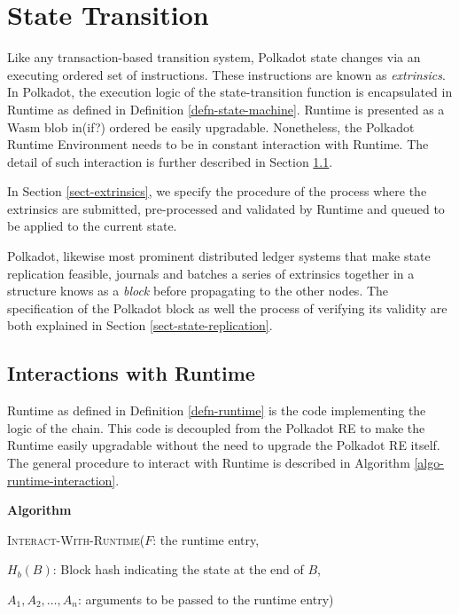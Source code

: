\documentclass{book}
\newcommand{\tmem}[1]{{\em #1\/}}
\newcommand{\tmname}[1]{\textsc{#1}}
\newcommand{\tmtextbf}[1]{{\bfseries{#1}}}
\newcommand{\tmtextup}[1]{{\upshape{#1}}}
\newenvironment{tmindent}{\begin{tmparmod}{1.5em}{0pt}{0pt}}{\end{tmparmod}}
\newenvironment{tmparmod}[3]{\begin{list}{}{\setlength{\topsep}{0pt}\setlength{\leftmargin}{#1}\setlength{\rightmargin}{#2}\setlength{\parindent}{#3}\setlength{\listparindent}{\parindent}\setlength{\itemindent}{\parindent}\setlength{\parsep}{\parskip}} \item[]}{\end{list}}
\newcounter{tmcounter}
\newcommand{\custombinding}[1]{%
  \setcounter{tmcounter}{#1}%
  \addtocounter{tmcounter}{-1}%
  \refstepcounter{tmcounter}}
\begin{document}
\chapter{State Transition}\label{chap-state-transit}

Like any transaction-based transition system, Polkadot state changes via an
executing ordered set of instructions. These instructions are known as
{\tmem{extrinsics}}. In Polkadot, the execution logic of the state-transition
function is encapsulated in Runtime as defined in Definition
\ref{defn-state-machine}. Runtime is presented as a Wasm blob in(if?) ordered
be easily upgradable. Nonetheless, the Polkadot Runtime Environment needs to
be in constant interaction with Runtime. The detail of such interaction is
further described in Section \ref{sect-entries-into-runtime}.

In Section \ref{sect-extrinsics}, we specify the procedure of the process
where the extrinsics are submitted, pre-processed and validated by Runtime and
queued to be applied to the current state.

Polkadot, likewise most prominent distributed ledger systems that make state
replication feasible, journals and batches a series of extrinsics together in
a structure knows as a {\tmem{block}} before propagating to the other nodes.
The specification of the Polkadot block as well the process of verifying its
validity are both explained in Section \ref{sect-state-replication}.

\section{Interactions with Runtime}\label{sect-entries-into-runtime}

Runtime as defined in Definition \ref{defn-runtime} is the code implementing
the logic of the chain. This code is decoupled from the Polkadot RE to make
the Runtime easily upgradable without the need to upgrade the Polkadot RE
itself. The general procedure to interact with Runtime is described in
Algorithm \ref{algo-runtime-interaction}.

\custombinding{3}{\noindent}\begin{tmparmod}{0pt}{0pt}{0em}%
    \tmtextbf{Algorithm \tmtextup{3}}{\smallskip}
    
    \begin{tmindent}
      \label{algo-runtime-interaction}{\tmname{Interact-With-Runtime}}($F$:
      the runtime entry,
      
      $H_b (B)$: Block hash indicating the state at the end of $B$,
      
      $A_1, A_2, \ldots, A_n$: arguments to be passed to the runtime entry)
    \end{tmindent}
\end{tmparmod}{\medskip}
\end{document}
